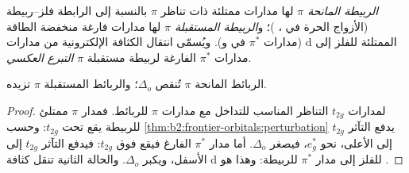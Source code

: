 \begin{definition}\label{def:b2:ligand-field:pi-ligands}
\emph{الربيطة المانحة $\pi$} لها مدارات ممتلئة
ذات تناظر $\pi$ بالنسبة إلى الرابطة فلز--ربيطة (الأزواج الحرة في ،
)؛ و\emph{الربيطة المستقبلة $\pi$}
لها مدارات فارغة منخفضة الطاقة (مدارات $\pi^*$ في  و). ويُسمّى انتقال
الكثافة الإلكترونية من مدارات d الممتلئة للفلز إلى مدارات $\pi^*$ الفارغة لربيطة
مستقبلة $\pi$ \emph{التبرع العكسي}.
\end{definition}

\begin{proposition}\label{prop:b2:ligand-field:pi-effects}
الربائط المانحة $\pi$ تُنقص $\Delta_o$؛ والربائط المستقبلة $\pi$ تزيده.
\end{proposition}

\begin{proof}
لمدارات $t_{2g}$ التناظر المناسب للتداخل مع مدارات $\pi$ للربائط. فمدار $\pi$
ممتلئ للربيطة يقع تحت $t_{2g}$: وحسب \cref{thm:b2:frontier-orbitals:perturbation} يدفع
التآثر $t_{2g}$ إلى الأعلى، نحو $e_g^*$، فيصغر $\Delta_o$. أما مدار $\pi^*$ الفارغ فيقع
فوق $t_{2g}$: فيدفع التآثر $t_{2g}$ إلى الأسفل، ويكبر $\Delta_o$. والحالة الثانية
تنقل كثافة d للفلز إلى مدار $\pi^*$ للربيطة: وهذا هو .
\end{proof}


